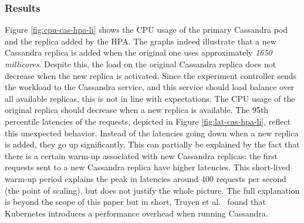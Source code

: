 \subsubsection{Results}
Figure \ref{fig:cpu-cas-hpa-li} shows the CPU usage of the primary Cassandra pod and the replica added by the HPA. The graphs indeed illustrate that a new Cassandra replica is added when the original one uses approximately \textit{1650 millicores}. Despite this, the load on the original Cassandra replica does not decrease when the new replica is activated. Since the experiment controller sends the workload to the Cassandra service, and this service should load balance over all available replicas, this is not in line with expectations. The CPU usage of the original replica should decrease when a new replica is available. The 95th percentile latencies of the requests, depicted in Figure \ref{fig:lat-cas-hpa-li}, reflect this unexpected behavior. Instead of the latencies going down when a new replica is added, they go up significantly. This can partially be explained by the fact that there is a certain warm-up associated with new Cassandra replicas: the first requests sent to a new Cassandra replica have higher latencies. This short-lived warm-up period explains the peak in latencies around 400 requests per second (the point of scaling), but does not justify the whole picture. The full explanation is beyond the scope of this paper but in short, Truyen et al.~\citep{TruyenEddy2019Pooc} found that Kubernetes introduces a performance overhead when running Cassandra. %

